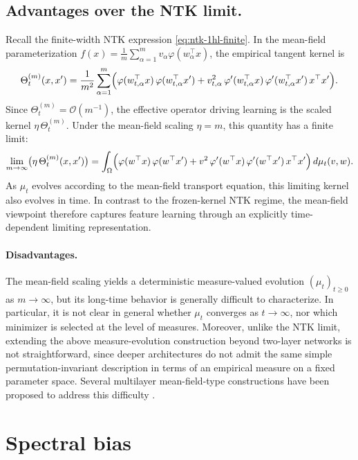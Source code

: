 \subsection{Advantages over the NTK limit.}
Recall the finite-width NTK expression \eqref{eq:ntk-1hl-finite}. In the
mean-field parameterization
$f(x)=\frac1m\sum_{\alpha=1}^m v_\alpha\varphi(w_\alpha^\top x)$, the empirical
tangent kernel is
\begin{equation}
	\Theta^{(m)}_t(x,x')
	=
	\frac{1}{m^2}\sum_{\alpha=1}^m
	\Bigl(
	\varphi(w_{t,\alpha}^\top x)\,\varphi(w_{t,\alpha}^\top x')
	+
	v_{t,\alpha}^2\,\varphi'(w_{t,\alpha}^\top x)\,\varphi'(w_{t,\alpha}^\top x')\,x^\top x'
	\Bigr).
	\label{eq:mf-ntk-equation}
\end{equation}
Since $\Theta_t^{(m)}=\mathcal O(m^{-1})$, the effective operator driving
learning is the scaled kernel $\eta\,\Theta_t^{(m)}$. Under the mean-field
scaling $\eta=m$, this quantity has a finite limit:
\[
	\lim_{m\to\infty}\bigl(\eta\,\Theta^{(m)}_t(x,x')\bigr)
	=
	\int_\Omega
	\Bigl(
	\varphi(w^\top x)\,\varphi(w^\top x')
	+
	v^2\,\varphi'(w^\top x)\,\varphi'(w^\top x')\,x^\top x'
	\Bigr)\,d\mu_t(v,w).
\]
As $\mu_t$ evolves according to the mean-field transport equation, this
limiting kernel also evolves in time. In contrast to the frozen-kernel NTK
regime, the mean-field viewpoint therefore captures feature learning through an
explicitly time-dependent limiting representation.

\paragraph{Disadvantages.}
The mean-field scaling yields a deterministic measure-valued evolution
$(\mu_t)_{t\ge 0}$ as $m\to\infty$, but its long-time behavior is generally
difficult to characterize. In particular, it is not clear in general whether
$\mu_t$ converges as $t\to\infty$, nor which minimizer is selected at the level
of measures. Moreover, unlike the NTK limit, extending the above
measure-evolution construction beyond two-layer networks is not straightforward,
since deeper architectures do not admit the same simple permutation-invariant
description in terms of an empirical measure on a fixed parameter space.
Several multilayer mean-field-type constructions have been proposed to address
this difficulty
\citep{nguyen2019meanfieldlimitlearning,araujo2019meanfieldlimitcertaindeep,
	sirignano2019meanfieldanalysisneural,nguyen2023rigorousframeworkmeanfield}.


\section{Spectral bias}\label{sec:spectral-bias}

